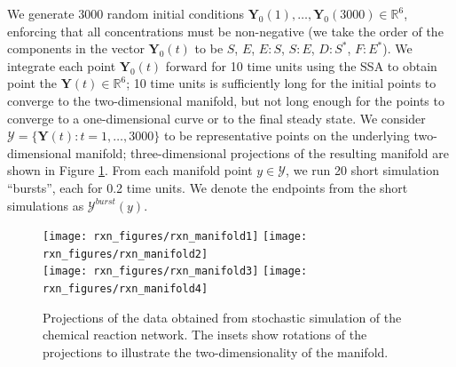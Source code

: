 \documentclass[aip,jcp,preprint]{revtex4-1}
\begin{document}
We generate 3000 random initial conditions $\mathbf{Y}_0(1), \dots, \mathbf{Y}_0(3000) \in \mathbb{R}^6$, enforcing that all concentrations must be non-negative
(we take the order of the components in the vector $\mathbf{Y}_0(t)$ to be $S$, $E$, $E:S$, $S:E$, $D:S^{*}$, $F:E^{*}$).
%
We integrate each point $\mathbf{Y}_0(t)$ forward for 10 time units using the SSA to obtain point the $\mathbf{Y}(t) \in \mathbb{R}^6$;
10 time units is sufficiently long for the initial points to converge to the two-dimensional manifold,
but not long enough for the points to converge to a one-dimensional curve or to the final steady state.
%
We consider $\mathcal{Y} = \{ \mathbf{Y}(t): t=1, \dots, 3000 \}$ to be representative points on the underlying two-dimensional manifold;
three-dimensional projections of the resulting manifold are shown in Figure \ref{fig:rxn_manifolds}.
%
From each manifold point $y \in \mathcal{Y}$, we run 20 short simulation ``bursts'', each for 0.2 time units.
%
We denote the endpoints from the short simulations as $\mathcal{Y}^{burst}(y)$.

\begin{figure}[ht]
  \texttt{[image: rxn\_figures/rxn\_manifold1]}
  \texttt{[image: rxn\_figures/rxn\_manifold2]} \\
  \texttt{[image: rxn\_figures/rxn\_manifold3]}
  \texttt{[image: rxn\_figures/rxn\_manifold4]} \\
    \caption{Projections of the data obtained from stochastic simulation of the chemical reaction network. The insets show rotations of the projections to illustrate the two-dimensionality of the manifold.}
    \label{fig:rxn_manifolds}
\end{figure}
\end{document}
